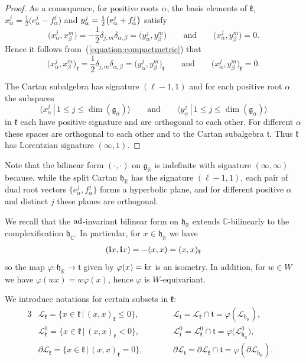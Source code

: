 \documentclass[pdftex]{sigma}
\numberwithin{equation}{section}
\def\C{{\mathbb C}}
\def\R{\mathbb{R}}
\def\la{\langle}
\def\ra{\rangle}
\def\bi{{\bf i}}
\def\cL{\mathcal L}
\def\g{\mathfrak{g}}
\def\h{\mathfrak{h}}
\def\k{\mathfrak{k}}
\def\ft{\mathfrak{t}}
\begin{document}
\begin{proof}
As a consequence, for positive roots $\alpha$, the basis elements of $\k$, $x_{\alpha}^j = \frac{1}{2}\big(e_{\alpha}^j-f_{\alpha}^j\big)$ and
$y_{\alpha}^j=\frac{{\bi}}{2}\big(e_{\alpha}^j+f_{\alpha}^j\big)$ satisfy
\[\big(x_{\alpha}^j, x_{\beta}^m\big) = -\frac{1}{2}\delta_{j,m}\delta_{\alpha, \beta} = \big(y_{\alpha}^j,y_{\beta}^m\big) \qquad \text{and} \qquad
\big(x_{\alpha}^j, y_{\beta}^m\big) = 0.\]
Hence it follows from~(\ref{equation:compactmetric}) that
\[\big(x_{\alpha}^j, x_{\beta}^m\big)_\k = \frac{1}{2}\delta_{j,m}\delta_{\alpha, \beta} = \big(y_{\alpha}^j,y_{\beta}^m\big)_\k \qquad \text{and} \qquad
\big(x_{\alpha}^j, y_{\beta}^m\big)_\k = 0.\]

The Cartan subalgebra has signature $(\ell-1,1)$ and for each positive root $\alpha$ the subspaces
\[\big\la x_{\alpha}^{j}\, |\, 1\leq j\leq \dim (\g_{\alpha})\big\ra \qquad \text{and} \qquad
 \big\la y_{\alpha}^{j} \, |\, 1\leq j\leq \dim (\g_{\alpha}) \big\ra\]
in $\k$ each have positive signature and are orthogonal to each other. For different $\alpha$ these spaces are orthogonal to each other and to the Cartan subalgebra $\ft$. Thus $\k$ has Lorentzian signature $(\infty,1)$.
\end{proof}

\begin{Remark} Note that the bilinear form $(\cdot,\cdot)$ on $\g_\R$ is indefinite with signature $(\infty,\infty)$ because, while the split Cartan $\h_{\R}$ has the signature $(\ell-1,1)$, each pair of dual root vectors $\big\{e_{\alpha}^{j}, f_{\alpha}^{j}\big\}$ forms a hyperbolic plane, and for different positive $\alpha$ and distinct $j$ these planes are orthogonal.
\end{Remark}

We recall that the ${\rm ad}$-invariant bilinear form on $\h_{\R}$ extends $\C$-bilinearly to the complexification $\h_{\C}$. In particular, for $x\in\h_{\R}$ we have
\begin{gather*}%
({\bi}x,{\bi}x)=-(x,x)=(x,x)_{\k}
\end{gather*}
so the map $\varphi\colon \h_\R \longrightarrow \ft$ given by $\varphi(x) = {\bi}x$ is an isometry. In addition, for $w\in W$ we have $\varphi(wx)=w\varphi(x)$, hence $\varphi$ is $W$-equivariant.

We introduce notations for certain subsets in $\k$:
\begin{alignat*}{3}
& \cL_{\k}=\{x\in \k\,|\, (x,x)_{\k}\leq 0\},\qquad && \cL_{\ft} = \cL_{\k}\cap \ft = \varphi(\cL_{\h_\R}),&\\
& \cL_{\k}^0=\{x\in \k\,|\, (x,x)_{\k}< 0\}, \qquad && \cL_{\ft}^0 = \cL_{\k}^0\cap \ft = \varphi\big(\cL_{\h_\R}^0\big),& \\
& \partial\cL_{\k}=\{x\in \k\,|\, (x,x)_{\k}= 0\}, \qquad && \partial\cL_{\ft} = \partial\cL_{\k}\cap \ft = \varphi(\partial\cL_{\h_\R}).&
\end{alignat*}
\end{document}
